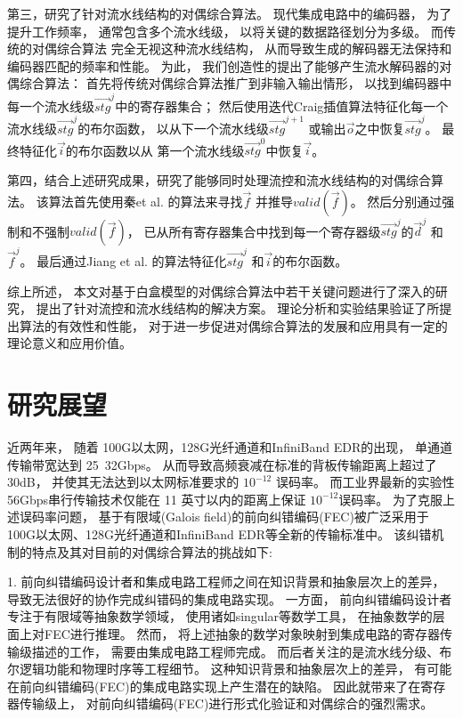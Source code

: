第三，研究了针对流水线结构的对偶综合算法。
现代集成电路中的编码器，
为了提升工作频率，
通常包含多个流水线级，
以将关键的数据路径划分为多级。
而传统的对偶综合算法
完全无视这种流水线结构，
从而导致生成的解码器无法保持和编码器匹配的频率和性能。
为此，
我们创造性的提出了能够产生流水解码器的对偶综合算法：
首先将传统对偶综合算法推广到非输入输出情形，
以找到编码器中每一个流水线级$\vec{stg}^j$中的寄存器集合；
然后使用迭代Craig插值算法特征化每一个流水线级$\vec{stg}^j$的布尔函数，
以从下一个流水线级$\vec{stg}^{j+1}$ 或输出$\vec{o}$之中恢复$\vec{stg}^j$。
最终特征化$\vec{i}$的布尔函数以从
第一个流水线级$\vec{stg}^0$中恢复$\vec{i}$。

第四，结合上述研究成果，研究了能够同时处理流控和流水线结构的对偶综合算法。
该算法首先使用秦et al. 的算法来寻找$\vec{f}$ 并推导$valid(\vec{f})$。
然后分别通过强制和不强制$valid(\vec{f})$，
已从所有寄存器集合中找到每一个寄存器级$\vec{stg}^j$的$\vec{d}^j$ 和$\vec{f}^j$。
最后通过Jiang et al. 的算法特征化$\vec{stg}^j$ 和$\vec{i}$的布尔函数。

综上所述，
本文对基于白盒模型的对偶综合算法中若干关键问题进行了深入的研究，
提出了针对流控和流水线结构的解决方案。
理论分析和实验结果验证了所提出算法的有效性和性能，
对于进一步促进对偶综合算法的发展和应用具有一定的理论意义和应用价值。

\section{研究展望}
近两年来，
随着 100G以太网，128G光纤通道和InfiniBand EDR的出现，
单通道传输带宽达到 25~32Gbps。
从而导致高频衰减在标准的背板传输距离上超过了 30dB，
并使其无法达到以太网标准要求的 $10^{-12}$ 误码率。
而工业界最新的实验性 56Gbps串行传输技术仅能在 11 英寸以内的距离上保证 $10^{-12}$误码率。
为了克服上述误码率问题，
基于有限域(Galois field)的前向纠错编码(FEC)被广泛采用于100G以太网、128G光纤通道和InfiniBand EDR等全新的传输标准中。
该纠错机制的特点及其对目前的对偶综合算法的挑战如下:

1. 前向纠错编码设计者和集成电路工程师之间在知识背景和抽象层次上的差异，
导致无法很好的协作完成纠错码的集成电路实现。
一方面，
前向纠错编码设计者专注于有限域等抽象数学领域，
使用诸如singular等数学工具，
在抽象数学的层面上对FEC进行推理。
然而，
将上述抽象的数学对象映射到集成电路的寄存器传输级描述的工作，
需要由集成电路工程师完成。
而后者关注的是流水线分级、布尔逻辑功能和物理时序等工程细节。
这种知识背景和抽象层次上的差异，
有可能在前向纠错编码(FEC)的集成电路实现上产生潜在的缺陷。
因此就带来了在寄存器传输级上，
对前向纠错编码(FEC)进行形式化验证和对偶综合的强烈需求。

